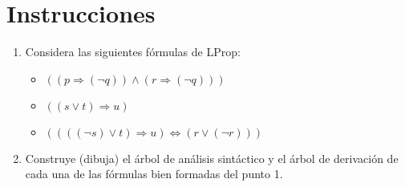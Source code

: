 \documentclass[12pt]{article}
\begin{document}
\section*{Instrucciones}
\begin{enumerate}
  \item Considera las siguientes fórmulas de LProp:
    \begin{itemize}
    \item $\left((p\Rightarrow (\neg q))\wedge (r\Rightarrow (\neg q))\right)$
    \item $\left((s\vee t)\Rightarrow u\right)$
    \item $\left((((\neg s)\vee t)\Rightarrow u)\Longleftrightarrow(r\vee (\neg r))\right)$
    \end{itemize}
  \item Construye (dibuja) el árbol de análisis sintáctico y el árbol de derivación de cada una de las fórmulas bien formadas del punto 1.
\end{enumerate}
\end{document}
